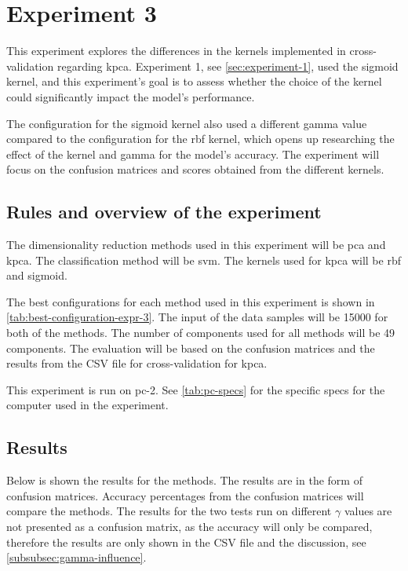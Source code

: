 \section{Experiment 3}\label{sec:experiment-3}
This experiment explores the differences in the kernels implemented in cross-validation regarding \gls{kpca}. Experiment 1, see \autoref{sec:experiment-1}, used the sigmoid kernel, and this experiment's goal is to assess whether the choice of the kernel could significantly impact the model's performance.

The configuration for the sigmoid kernel also used a different gamma value compared to the configuration for the \gls{rbf} kernel, which opens up researching the effect of the kernel and gamma for the model's accuracy. The experiment will focus on the confusion matrices and scores obtained from the different kernels.


\subsection{Rules and overview of the experiment}
The dimensionality reduction methods used in this experiment will be \gls{pca} and \gls{kpca}. The classification method will be \gls{svm}. The kernels used for \gls{kpca} will be \gls{rbf} and sigmoid.

The best configurations for each method used in this experiment is shown in \autoref{tab:best-configuration-expr-3}. The input of the data samples will be 15000 for both of the methods. The number of components used for all methods will be 49 components. The evaluation will be based on the confusion matrices and the results from the CSV file for cross-validation for \gls{kpca}. 




This experiment is run on pc-2. See \autoref{tab:pc-specs} for the specific specs for the computer used in the experiment.

\subsection{Results}\label{subsec:experiment-3-results}
Below is shown the results for the methods. The results are in the form of confusion matrices. Accuracy percentages from the confusion matrices will compare the methods. The results for the two tests run on different $\gamma$ values are not presented as a confusion matrix, as the accuracy will only be compared, therefore the results are only shown in the CSV file and the discussion, see \autoref{subsubsec:gamma-influence}.

